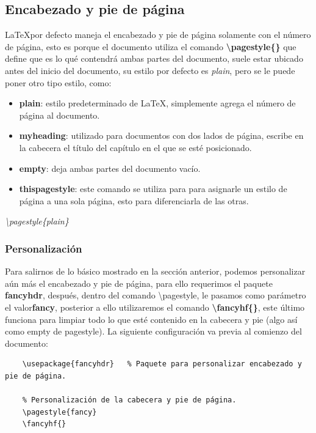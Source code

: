 \subsection{Encabezado y pie de página}
\hspace{0.55cm}\LaTeX por defecto maneja el encabezado y pie de página solamente con el número de página, esto es porque el documento utiliza el comando \textbf{\textbackslash{pagestyle\{\}}} que define que es lo qué contendrá ambas partes del documento, suele estar ubicado antes del inicio del documento, su estilo por defecto es \textit{plain}, pero se le puede poner otro tipo estilo, como:
\begin{itemize}
    \item \textbf{plain}: estilo predeterminado de \LaTeX, simplemente agrega el número de página al documento.
    \item \textbf{myheading}: utilizado para documentos con dos lados de página, escribe en la cabecera el título del capítulo en el que se esté posicionado.
    \item \textbf{empty}: deja ambas partes del documento vacío.
    \item \textbf{thispagestyle}: este comando se utiliza para para asignarle un estilo de página a una sola página, esto para diferenciarla de las otras.
\end{itemize}
\begin{center}
    \textit{\textbackslash{pagestyle\{plain\}}}
\end{center}


\subsubsection{Personalización}
\hspace{0.55cm}Para salirnos de lo básico mostrado en la sección anterior, podemos personalizar aún más el encabezado y pie de página, para ello requerimos el paquete \textbf{fancyhdr}, después, dentro del comando \textbackslash{pagestyle}, le pasamos como parámetro el valor\textbf{fancy}, posterior a ello utilizaremos el comando \textbf{\textbackslash{fancyhf\{\}}}, este último funciona para limpiar todo lo que esté contenido en la cabecera y pie (algo así como empty de pagestyle). La siguiente configuración va previa al comienzo del documento:
\begin{lstlisting}
    \usepackage{fancyhdr}	% Paquete para personalizar encabezado y pie de página.
    
    % Personalización de la cabecera y pie de página.
    \pagestyle{fancy}
    \fancyhf{}

    
    
    
\end{lstlisting}

